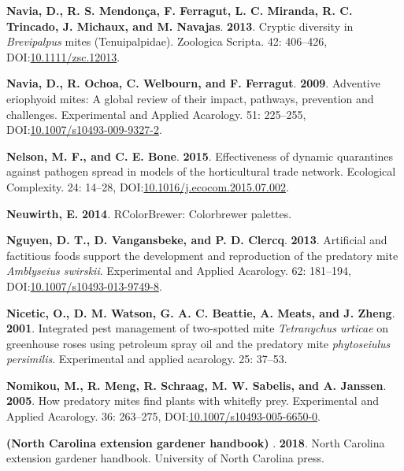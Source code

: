 \documentclass[12pt,final,CPage]{ufthesis}
\newlength{\cslhangindent}
\newenvironment{CSLReferences}[2] %
{%
	\setlength{\parindent}{0pt}
	\ifodd #1 \everypar{\setlength{\hangindent}{\cslhangindent}}\ignorespaces\fi
	\ifnum #2 > 0
	\setlength{\parskip}{#2\baselineskip}
	\fi
}%
{}
\begin{document}
{\begin{CSLReferences}{1}{0}
  \leavevmode{}%
  \textbf{Navia, D., R. S. Mendonça, F. Ferragut, L. C. Miranda, R. C. Trincado, J. Michaux, and M. Navajas}. \textbf{2013}. Cryptic diversity in {\emph{Brevipalpus}} mites ({Tenuipalpidae}). Zoologica Scripta. 42: 406--426, DOI:\href{https://doi.org/10.1111/zsc.12013}{10.1111/zsc.12013}.

  \leavevmode{}%
  \textbf{Navia, D., R. Ochoa, C. Welbourn, and F. Ferragut}. \textbf{2009}. Adventive eriophyoid mites: A global review of their impact, pathways, prevention and challenges. Experimental and Applied Acarology. 51: 225--255, DOI:\href{https://doi.org/10.1007/s10493-009-9327-2}{10.1007/s10493-009-9327-2}.

  \leavevmode{}%
  \textbf{Nelson, M. F., and C. E. Bone}. \textbf{2015}. Effectiveness of dynamic quarantines against pathogen spread in models of the horticultural trade network. Ecological Complexity. 24: 14--28, DOI:\href{https://doi.org/10.1016/j.ecocom.2015.07.002}{10.1016/j.ecocom.2015.07.002}.

  \leavevmode{}%
  \textbf{Neuwirth, E.} \textbf{2014}. {RColorBrewer}: Colorbrewer palettes.

  \leavevmode{}%
  \textbf{Nguyen, D. T., D. Vangansbeke, and P. D. Clercq}. \textbf{2013}. Artificial and factitious foods support the development and reproduction of the predatory mite {\emph{Amblyseius swirskii}}. Experimental and Applied Acarology. 62: 181--194, DOI:\href{https://doi.org/10.1007/s10493-013-9749-8}{10.1007/s10493-013-9749-8}.

  \leavevmode{}%
  \textbf{Nicetic, O., D. M. Watson, G. A. C. Beattie, A. Meats, and J. Zheng}. \textbf{2001}. Integrated pest management of two-spotted mite {\emph{Tetranychus urticae}} on greenhouse roses using petroleum spray oil and the predatory mite \emph{phytoseiulus persimilis}. Experimental and applied acarology. 25: 37--53.

  \leavevmode{}%
  \textbf{Nomikou, M., R. Meng, R. Schraag, M. W. Sabelis, and A. Janssen}. \textbf{2005}. How predatory mites find plants with whitefly prey. Experimental and Applied Acarology. 36: 263--275, DOI:\href{https://doi.org/10.1007/s10493-005-6650-0}{10.1007/s10493-005-6650-0}.

  \leavevmode{}%
  \textbf{({North Carolina} extension gardener handbook) }. \textbf{2018}. {North Carolina} extension gardener handbook. University of {North Carolina} press.


\end{CSLReferences}}
\end{document}

